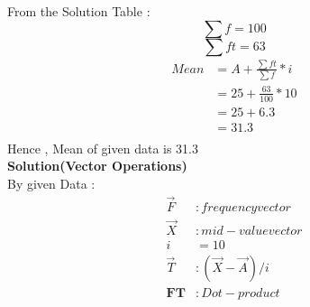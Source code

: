 \documentclass[12pt, a4paper, twocolumn]{article}
\begin{document}
From the Solution Table :\\
\begin{equation*}
\sum f = 100
\end{equation*}
\begin{equation*}
\sum ft = 63
\end{equation*}
\begin{align*}
Mean & = A + \frac{ \sum ft }{\sum f} * i\\
     & = 25 + \frac{63}{100} * 10\\
     & = 25 + 6.3\\
     & = 31.3\\\
\end{align*}
Hence , Mean of given data is 31.3\\
\newpage
\textbf{Solution(Vector Operations)}\\
By given Data :\\
\begin{align*}
\vec{F} & : frequency vector\\
\vec{X} & : mid-value vector\\
i & = 10\\
\vec{T} & : (\vec{X}-\vec{A})/i\\
\textbf{FT}& : Dot-product\\
\end{align*}
\end{document}
